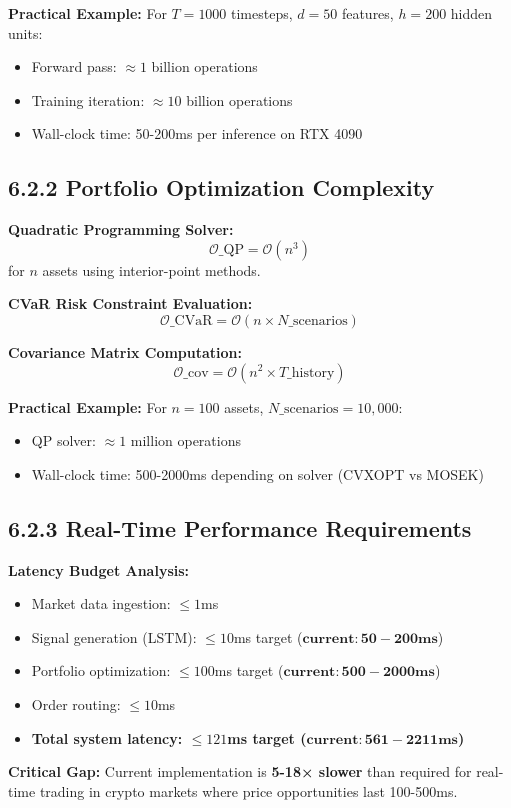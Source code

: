 \documentclass[11pt,a4paper]{article}
\begin{document}
\textbf{Practical Example:} For $T=1000$ timesteps, $d=50$ features, $h=200$ hidden units:
\begin{itemize}
\item Forward pass: $\approx 1$ billion operations  
\item Training iteration: $\approx 10$ billion operations
\item Wall-clock time: 50-200ms per inference on RTX 4090

\end{itemize}
\subsection{6.2.2 Portfolio Optimization Complexity}

\textbf{Quadratic Programming Solver:}
\begin{equation}
\mathcal{O}\_{\text{QP}} = \mathcal{O}(n^3)
\end{equation}
for $n$ assets using interior-point methods.

\textbf{CVaR Risk Constraint Evaluation:}
\begin{equation}
\mathcal{O}\_{\text{CVaR}} = \mathcal{O}(n \times N\_{\text{scenarios}})
\end{equation}

\textbf{Covariance Matrix Computation:}
\begin{equation}
\mathcal{O}\_{\text{cov}} = \mathcal{O}(n^2 \times T\_{\text{history}})
\end{equation}

\textbf{Practical Example:} For $n=100$ assets, $N\_{\text{scenarios}}=10,000$:
\begin{itemize}
\item QP solver: $\approx 1$ million operations
\item Wall-clock time: 500-2000ms depending on solver (CVXOPT vs MOSEK)

\end{itemize}
\subsection{6.2.3 Real-Time Performance Requirements}

\textbf{Latency Budget Analysis:}
\begin{itemize}
\item Market data ingestion: $\leq 1$ms
\item Signal generation (LSTM): $\leq 10$ms target ($\mathbf{current: 50-200ms}$)
\item Portfolio optimization: $\leq 100$ms target ($\mathbf{current: 500-2000ms}$)
\item Order routing: $\leq 10$ms
\item \textbf{Total system latency: $\leq 121$ms target ($\mathbf{current: 561-2211ms}$)}

\end{itemize}
\textbf{Critical Gap:} Current implementation is \textbf{5-18× slower} than required for real-time trading in crypto markets where price opportunities last 100-500ms.
\end{document}
